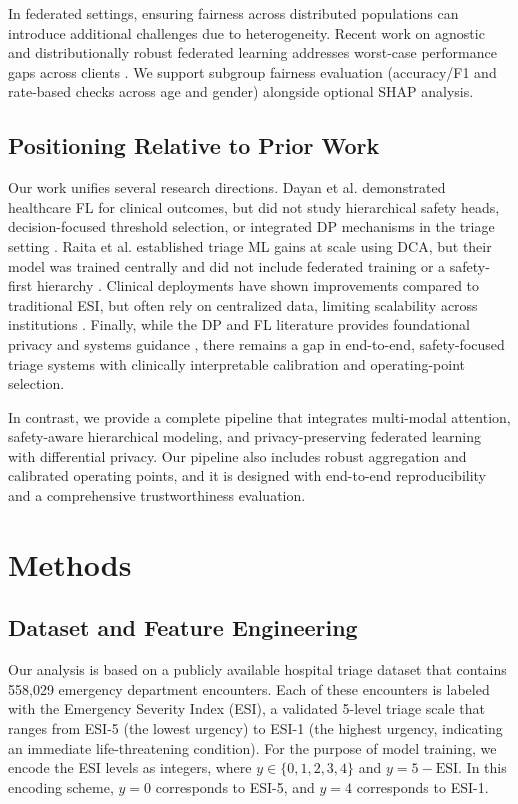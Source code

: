 \documentclass[journal,article,submit,pdftex,moreauthors]{Definitions/mdpi}
\begin{document}
In federated settings, ensuring fairness across distributed populations can introduce additional challenges due to heterogeneity. Recent work on agnostic and distributionally robust federated learning addresses worst-case performance gaps across clients \cite{mohri2019agnostic}. We support subgroup fairness evaluation (accuracy/F1 and rate-based checks across age and gender) alongside optional SHAP analysis.

\subsection{Positioning Relative to Prior Work}

Our work unifies several research directions. Dayan et al. demonstrated healthcare FL for clinical outcomes, but did not study hierarchical safety heads, decision-focused threshold selection, or integrated DP mechanisms in the triage setting \cite{dayan2021}. Raita et al. established triage ML gains at scale using DCA, but their model was trained centrally and did not include federated training or a safety-first hierarchy \cite{raita2019}. Clinical deployments have shown improvements compared to traditional ESI, but often rely on centralized data, limiting scalability across institutions \cite{levin2018}. Finally, while the DP and FL literature provides foundational privacy and systems guidance \cite{dwork2006,kairouz2021}, there remains a gap in end-to-end, safety-focused triage systems with clinically interpretable calibration and operating-point selection.

In contrast, we provide a complete pipeline that integrates multi-modal attention, safety-aware hierarchical modeling, and privacy-preserving federated learning with differential privacy. Our pipeline also includes robust aggregation and calibrated operating points, and it is designed with end-to-end reproducibility and a comprehensive trustworthiness evaluation.

\section{Methods}\label{sec:methods}

\subsection{Dataset and Feature Engineering}\label{sec:dataset}

Our analysis is based on a publicly available hospital triage dataset that contains 558,029 emergency department encounters. Each of these encounters is labeled with the Emergency Severity Index (ESI), a validated 5-level triage scale that ranges from ESI-5 (the lowest urgency) to ESI-1 (the highest urgency, indicating an immediate life-threatening condition). For the purpose of model training, we encode the ESI levels as integers, where $y \in \{0, 1, 2, 3, 4\}$ and $y = 5 - \text{ESI}$. In this encoding scheme, $y=0$ corresponds to ESI-5, and $y=4$ corresponds to ESI-1.
\end{document}
